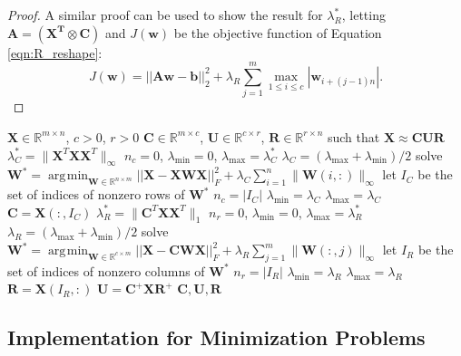 \documentclass[12pt]{article}
\DeclareMathOperator*{\argmin}{\arg\!\min}
\begin{document}
\begin{proof}
A similar proof can be used to show the result for $\lambda_R^*$, letting $\mathbf{A} = \mathbf{(X^T \otimes C)}$ and $J(\mathbf{w})$ be the objective function of Equation \ref{eqn:R_reshape}:
\[
J(\mathbf{w}) = ||\mathbf{Aw}-\mathbf{b}||^2_2 + \lambda_R \sum_{j=1}^m \max_{1 \leq i \leq c} |\mathbf{w}_{i+(j-1)n}|.
\]
\end{proof}

\begin{algorithm}
\caption{CUR through Convex Optimization}
\begin{algorithmic}[1]
\Require $\mathbf{X} \in \mathbb{R}^{m \times n}$, $c > 0$, $r > 0$
\Ensure $\mathbf{C} \in \mathbb{R}^{m \times c}$, $\mathbf{U} \in \mathbb{R}^{c \times r}$, $\mathbf{R} \in \mathbb{R}^{r \times n}$ such that $\mathbf{X \approx CUR}$
\State $\lambda_C^* = \| \mathbf{X}^T \mathbf{X} \mathbf{X}^T  \|_{\infty}$
\State $n_c = 0$, $\lambda_{\text{min}} = 0$, $\lambda_{\text{max}} = \lambda_C^*$
    \State $\lambda_{C} = (\lambda_{\text{max}} + \lambda_{\text{min}})/2$
    \State solve $\mathbf{W^*} = \argmin_{\mathbf{W} \in \mathbb{R}^{n \times m}} ||\mathbf{X-XWX}||_F^2 + \lambda_C \sum_{i=1}^n  \| \mathbf{W}(i,:) \|_{\infty}$
    \State let $I_C$ be the set of indices of nonzero rows of $\mathbf{W^*}$
    \State $n_c = |I_C|$
        \State $\lambda_{\text{min}} = \lambda_C$
        \State $\lambda_{\text{max}} = \lambda_C$
    \EndIf
\EndWhile
\State $\mathbf{C} = \mathbf{X}(:,I_C)$
\State $\lambda_R^* = \| \mathbf{C}^T \mathbf{X} \mathbf{X}^T  \|_{1}$
\State $n_r = 0$, $\lambda_{\text{min}} = 0$, $\lambda_{\text{max}} = \lambda_R^*$
    \State $\lambda_{R} = (\lambda_{\text{max}} + \lambda_{\text{min}})/2$
    \State solve $\mathbf{W^*} = \argmin_{\mathbf{W} \in \mathbb{R}^{c \times m}} ||\mathbf{X-CWX}||_F^2 + \lambda_R \sum_{j=1}^m \| \mathbf{W}(:,j) \|_{\infty}$
    \State let $I_R$ be the set of indices of nonzero columns of $\mathbf{W^*}$
    \State $n_r = |I_R|$
        \State $\lambda_{\text{min}} = \lambda_R$
        \State $\lambda_{\text{max}} = \lambda_R$
    \EndIf
\EndWhile
\State $\mathbf{R} = \mathbf{X}(I_R,:)$
\State $\mathbf{U = C^+XR^+}$
\State \Return $\mathbf{C,U,R}$
\end{algorithmic}
\label{alg:cur_co}
\end{algorithm}

\subsection{Implementation for Minimization Problems}
\label{sec:C_min}
\end{document}
